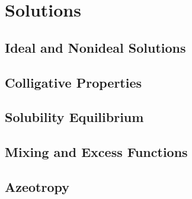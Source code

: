 \chapter{Solutions}
\section{Ideal and Nonideal Solutions}
\section{Colligative Properties}
\section{Solubility Equilibrium}
\section{Mixing and Excess Functions}
\section{Azeotropy}